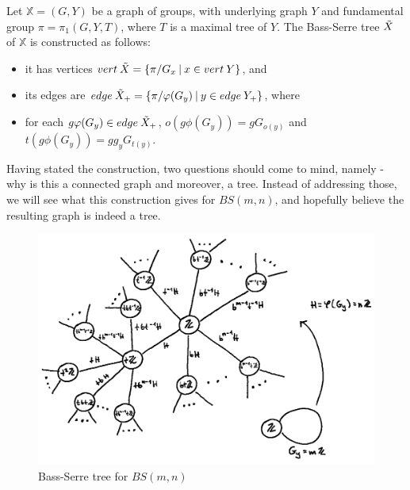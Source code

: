 \begin{construction}
    Let $\mathbb{X} = (G,Y)$ be a graph of groups, with underlying graph $Y$ and fundamental group $\pi = \pi_1(G,Y,T)$, where $T$ is a maximal tree of $Y$.
    The Bass-Serre tree $\Tilde{X}$ of $\mathbb{X}$ is constructed as follows:
    \begin{itemize}
        \item it has vertices $vert \: \Tilde{X} = \{\pi/G_x\:|\: x \in vert\:Y\}$, and
        \item its edges are $edge \: \Tilde{X}_+ = \{\pi/\phi(G_y) \: | \: y \in edge \:Y_+ \}$, where
        \item for each $g\phi(G_y) \in edge \: \Tilde{X}_+$, $o(g\phi(G_y)) = gG_{o(y)}$ and $t(g\phi(G_y)) = gg_yG_{t(y)}$.
    \end{itemize}
\end{construction}

Having stated the construction, two questions should come to mind, namely - why is this a connected graph and moreover, a tree. Instead of addressing those, we will see what this construction gives for $BS(m,n)$, and hopefully believe the resulting graph is indeed a tree.


\begin{figure}[ht]
    \centering
    \includegraphics[scale = 0.38]{sections/alicja/Tree of BS(m,n) corrected.jpeg}
    \caption{Bass-Serre tree for $BS(m,n)$}
    \label{BS tree}
\end{figure}


